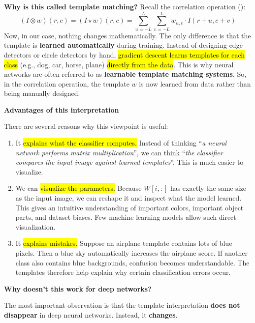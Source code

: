 \highspace
\textcolor{Green3}{ \textbf{Why is this called template matching?}} Recall the correlation operation ():
\begin{equation*}
    \left(I \otimes w\right)\left(r,c\right) = \left(I \star w\right)\left(r,c\right) = \sum_{u=-L}^{L} \sum_{v=-L}^{L} w_{u,v} \cdot I\left(r+u, c+v\right)
\end{equation*}
Now, in our case, nothing changes mathematically. The only difference is that the template is \textbf{learned automatically} during training. Instead of designing edge detectors or circle detectors by hand, \hl{gradient descent learns templates for each class} (e.g., dog, car, horse, plane) \hl{directly from the data}. This is why neural networks are often referred to as \textbf{learnable template matching systems}. So, in the correlation operation, the template $w$ is now learned from data rather than being manually designed.

\newpage

\begin{flushleft}
    \textcolor{Green3}{ \textbf{Advantages of this interpretation}}
\end{flushleft}
There are several reasons why this viewpoint is useful:
\begin{enumerate}
    \item It \hl{explains what the classifier computes.} Instead of thinking ``\emph{a neural network performs matrix multiplication}'', we can think ``\emph{the classifier compares the input image against learned templates}''. This is much easier to visualize.
    \item We can \hl{visualize the parameters.} Because $W\left[i,:\right]$ has exactly the same size as the input image, we can reshape it and inspect what the model learned. This gives an intuitive understanding of important colors, important object parts, and dataset biases. Few machine learning models allow such direct visualization.
    \item It \hl{explains mistakes.} Suppose an airplane template contains lots of blue pixels. Then a blue sky automatically increases the airplane score. If another class also contains blue backgrounds, confusion becomes understandable. The templates therefore help explain why certain classification errors occur.
\end{enumerate}

\highspace
\begin{flushleft}
    \textcolor{Red2}{ \textbf{Why doesn't this work for deep networks?}}
\end{flushleft}
The most important observation is that the template interpretation \textbf{does not disappear} in deep neural networks. Instead, it \textbf{changes}.

